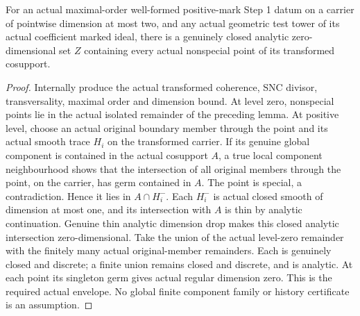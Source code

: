\begin{theorem}
\label{hir:dimtwo-stepone-nonspecial-envelope}
\leanok
For an actual maximal-order well-formed positive-mark Step 1 datum on a
carrier of pointwise dimension at most two, and any actual geometric test
tower of its actual coefficient marked ideal, there is a genuinely closed
analytic zero-dimensional set $Z$ containing every actual nonspecial point
of its transformed cosupport.
\end{theorem}
\begin{proof}
Internally produce the actual transformed coherence, SNC divisor,
transversality, maximal order and dimension bound. At level zero, nonspecial
points lie in the actual isolated remainder of the preceding lemma. At
positive level, choose an actual original boundary member through the point
and its actual smooth trace $H_i$ on the transformed carrier. If its genuine
global component is contained in the actual cosupport $A$, a true local
component neighbourhood shows that the intersection of all original members
through the point, on the carrier, has germ contained in $A$. The point
is special, a contradiction. Hence it lies in $A\cap H_i^-$.
Each $H_i^-$ is actual closed smooth of dimension at most one, and its
intersection with $A$ is thin by analytic continuation. Genuine thin
analytic dimension drop makes this closed analytic intersection zero-dimensional.
Take the union of the actual level-zero remainder with the finitely many
actual original-member remainders. Each is genuinely closed and discrete;
a finite union remains closed and discrete, and is analytic. At each point
its singleton germ gives actual regular dimension zero. This is the required
actual envelope. No global finite component family or history certificate
is an assumption.
\end{proof}

